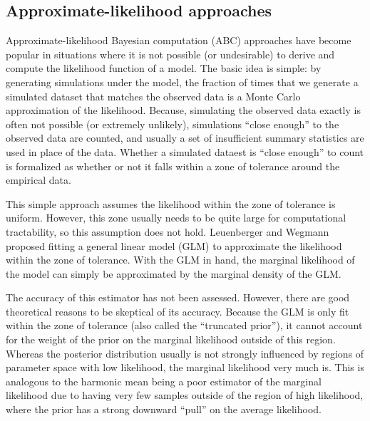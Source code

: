 \subsection{Approximate-likelihood approaches}

Approximate-likelihood Bayesian computation (ABC) approaches
\citep{Tavare1997,Beaumont2002} have become popular in situations where it is
not possible (or undesirable) to derive and compute the likelihood function of
a model.
The basic idea is simple: by generating simulations under the model, the
fraction of times that we generate a simulated dataset that matches the
observed data is a Monte Carlo approximation of the likelihood.
Because, simulating the observed data exactly is often not possible (or extremely
unlikely), simulations ``close enough'' to the observed data are
counted, and usually a set of insufficient summary statistics are used in place
of the data.
Whether a simulated dataest is ``close enough'' to count is formalized as
whether or not it falls within a zone of tolerance around the empirical data.

This simple approach assumes the likelihood within the zone of tolerance is
uniform.
However, this zone usually needs to be quite large for computational
tractability, so this assumption does not hold.
Leuenberger and Wegmann \citep{Leuenberger2010} proposed fitting a general
linear model (GLM) to approximate the likelihood within the zone of tolerance.
With the GLM in hand, the marginal likelihood of the model can simply be
approximated by the marginal density of the GLM.

The accuracy of this estimator has not been assessed.
However, there are good theoretical reasons to be skeptical of its accuracy.
Because the GLM is only fit within the zone of tolerance (also called the
``truncated prior''), it cannot account for the weight of the prior on the
marginal likelihood outside of this region.
Whereas the posterior distribution usually is not strongly influenced by
regions of parameter space with low likelihood, the marginal likelihood very
much is.
This is analogous to the harmonic mean being a poor estimator of the marginal
likelihood due to having very few samples outside of the region of high
likelihood, where the prior has a strong downward ``pull'' on the average
likelihood.

